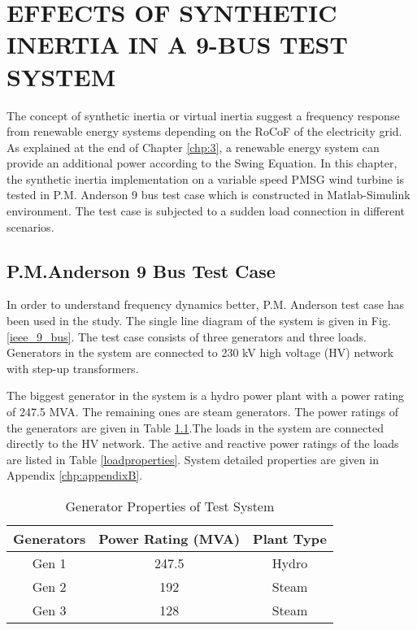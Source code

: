 \chapter{EFFECTS OF SYNTHETIC INERTIA IN A 9-BUS TEST SYSTEM}
\label{chp:5}
The concept of synthetic inertia or virtual inertia suggest a frequency response from renewable energy systems depending on the RoCoF of the electricity grid. As explained at the end of Chapter \ref{chp:3}, a renewable energy system can provide an additional power according to the Swing Equation. In this chapter, the synthetic inertia implementation on a variable speed PMSG wind turbine is tested in P.M. Anderson 9 bus test case which is constructed in Matlab-Simulink environment. The test case is subjected to a sudden load connection in different scenarios.
\section{P.M.Anderson 9 Bus Test Case}
In order to understand frequency dynamics better, P.M. Anderson test case has been used in the study. The single line diagram of the system is given in Fig. \ref{ieee_9_bus}. The test case consists of three generators and three loads. Generators in the system are connected to 230 kV high voltage (HV) network with step-up transformers.\par
The biggest generator in the system is a hydro power plant with a power rating of 247.5 MVA. The remaining ones are steam generators. The power ratings of the generators are given in Table \ref{generatorproperties}.The loads in the system are connected directly to the HV network. The active and reactive power ratings of the loads are listed in Table \ref{loadproperties}. System detailed properties are given in Appendix \ref{chp:appendixB}.
\begin{table}[h]
	\centering
	\begin{tabular}{ccc}
		\hline
		\textbf{Generators} & \textbf{Power Rating (MVA)} & \textbf{Plant Type} \\ \hline
		Gen 1               & 247.5                       & Hydro				\\
		Gen 2               & 192                         & Steam               \\
		Gen 3               & 128                         & Steam               \\ \hline
	\end{tabular}
	\caption{Generator Properties of Test System}
	\label{generatorproperties}
\end{table}
